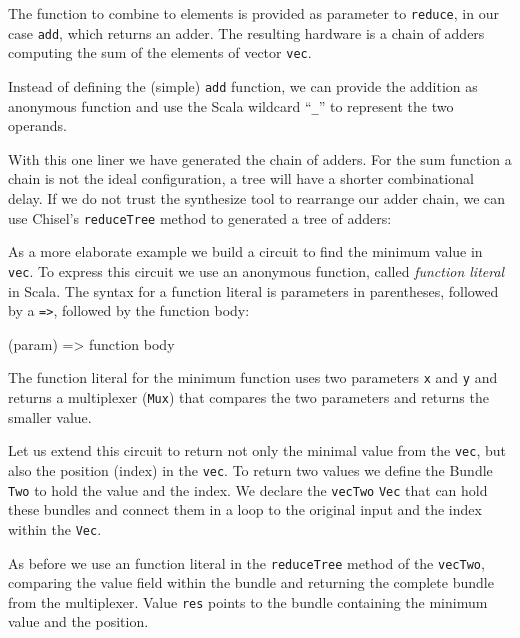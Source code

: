 \documentclass[%
    10pt,
    headinclude, footexclude,
    openright, %
    notitlepage,
    cleardoubleempty,
    headsepline,
    pointlessnumbers,
    bibtotoc, idxtotoc,
    ]{scrbook}
\newcommand{\code}[1]{{\small{\texttt{#1}}}}
\begin{document}
The function to combine to elements is provided as parameter to \code{reduce}, in our case \code{add},
which returns an adder. The resulting hardware is a chain of adders computing
the sum of the elements of vector \code{vec}.

Instead of defining the (simple) \code{add} function, we can provide the addition
as anonymous function and use the Scala wildcard ``\code{\_}'' to represent the
two operands.


\noindent With this one liner we have generated the chain of adders. For the sum function
a chain is not the ideal configuration, a tree will have a shorter combinational delay.
If we do not trust the synthesize tool to rearrange our adder chain, we can use Chisel's
\code{reduceTree} method to generated a tree of adders:


As a more elaborate example we build a circuit to find the minimum value in \code{vec}. To express this circuit
we use an anonymous function, called \emph{function literal} in Scala.  The syntax for a function
literal is parameters in parentheses, followed by a \code{=>}, followed by the function body:

\begin{chisel}
  (param) => function body
\end{chisel}

\noindent The function literal for the minimum function uses two parameters \code{x} and \code{y}
and returns a multiplexer (\code{Mux}) that compares the two parameters and returns the smaller
value.


Let us extend this circuit to return not only the minimal value from the \code{vec}, but also the
position (index) in the \code{vec}. To return two values we define the Bundle \code{Two} to
hold the value and the index. We declare the \code{vecTwo} \code{Vec} that can hold these bundles
and connect them in a loop to the original input and the index within the \code{Vec}.

As before we use an function literal in the \code{reduceTree} method of the \code{vecTwo},
comparing the value field within the bundle and returning the complete bundle from the multiplexer.
Value \code{res} points to the bundle containing the minimum value and the position.

\end{document}
